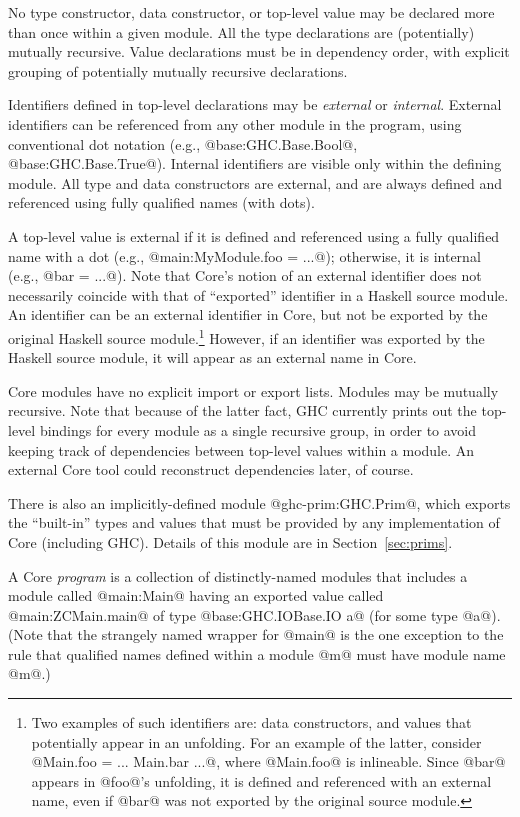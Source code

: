 \documentclass[10pt]{article}
\begin{document}
No type constructor, data constructor, or top-level value may be declared more than once within a given module.
All the type declarations are (potentially) mutually recursive. Value declarations must be
in dependency order, with explicit grouping of potentially mutually recursive declarations.


Identifiers defined in top-level declarations may be {\it external} or {\it internal}.
External identifiers can be referenced from any other module in
the program, using conventional dot notation (e.g., @base:GHC.Base.Bool@, @base:GHC.Base.True@).  
Internal identifiers are visible only within the defining module.
All type and data constructors are external, and are always defined and referenced using
fully qualified names (with dots).  

A top-level value is external if it is defined and referenced 
using a fully qualified name with a dot (e.g., @main:MyModule.foo = ...@); otherwise, it is internal
(e.g., @bar = ...@).  
Note that Core's notion of an external identifier does not necessarily coincide with that of ``exported''
identifier in a Haskell source module. An identifier can be an external identifier in Core, but not be exported by the original Haskell source module.\footnote{Two examples of such identifiers are: data constructors, and values that potentially appear in an unfolding. For an example of the latter, consider @Main.foo = ... Main.bar ...@, where @Main.foo@ is inlineable. Since @bar@ appears in @foo@'s unfolding, it is defined and referenced with an external name, even if @bar@ was not exported by the original source module.} However, if an identifier was exported by the Haskell source module, it will appear as an external name in Core.

Core modules have no explicit import or export lists. 
Modules may be mutually recursive. Note that because of the latter fact, GHC currently prints out the top-level bindings for every module as a single recursive group, in order to avoid keeping track of dependencies between top-level values within a module. An external Core tool could reconstruct dependencies later, of course.

There is also an implicitly-defined module @ghc-prim:GHC.Prim@, which exports the ``built-in'' types and values
that must be provided by any implementation of Core (including GHC).   Details of this
module are in Section~\ref{sec:prims}.

A Core {\em program} is a collection of distinctly-named modules that includes a module
called @main:Main@ having an exported value called @main:ZCMain.main@ of type @base:GHC.IOBase.IO a@ (for some type @a@). (Note that the strangely named wrapper for @main@ is the one exception to the rule that qualified names defined within a module @m@ must have module name @m@.)
\end{document}

